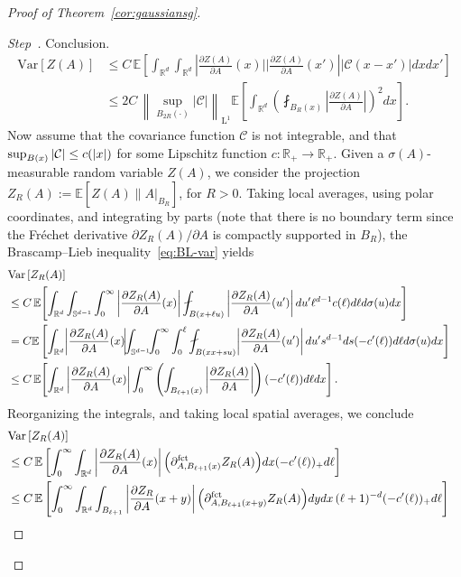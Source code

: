 \documentclass[11pt]{article}
\theoremstyle{definition}
\numberwithin{equation}{section}
\numberwithin{figure}{section}
\numberwithin{table}{section}
\newcommand{\R}{\mathbb R}
\newcommand{\Sp}{\mathbb S}
\newcommand{\E}{\mathbb{E}}
\newcommand{\Cc}{\mathcal C}
\DeclareMathOperator{\Ld}{L}
\newcommand{\parfct}[1]{\partial_{#1}^{\operatorname{fct}}}
\newcommand{\var}[1]{\mathrm{Var}\left[#1\right]}
\newcounter{stepcount}
\newenvironment{step}{\refstepcounter{stepcount}\begin{proof}[Step~\thestepcount]}{\let\qed\relax\end{proof}}
\begin{document}
\begin{proof}[Proof of Theorem~\ref{cor:gaussiansg}]
\begin{step}{Conclusion.}
\begin{align*}
\var{Z(A)}&\le C\,\E\left[\int_{\R^d}\int_{\R^d} \left|\frac{\partial Z(A)}{\partial A}(x)\bigg|\bigg|\frac{\partial Z(A)}{\partial A}(x')\right||\Cc(x-x')|dxdx'\right]
\\
&\le2C\,\left\|\sup_{B_{2R}(\cdot)}|\Cc|\right\|_{\Ld^1}\E\left[\int_{\R^d} \left(\fint_{B_R(x)}\left|\frac{\partial Z(A)}{\partial A}\right|\right)^2dx\right].
\end{align*}
Now assume that the covariance function $\Cc$ is not integrable, and that $\sup_{B(x)}\linebreak|\Cc|\le c(|x|)$ for some Lipschitz function $c:\R_+\to\R_+$. Given a $\sigma(A)$-measurable random variable $Z(A)$, we consider the projection $Z_R(A):=\E[Z(A)\| A|_{B_R}]$, for $R>0$. Taking local averages, using polar coordinates, and integrating by parts (note that there is no boundary term since the Fréchet derivative $\partial Z_R(A)/\partial A$ is compactly supported in $B_R$), the Brascamp--Lieb inequality~\eqref{eq:BL-var} yields
{\small
\begin{align*}
\lefteqn{\var{Z_R(A)}}
\\
&\le C\,\E\!\left[\int_{\R^d}\int_{\Sp^{d-1}}\int_0^\infty
\left|\frac{\partial Z_R(A)}{\partial A}(x) \right|\fint_{B(x+\ell u)}\left|\frac{\partial Z_R(A)}{\partial A}(u')\right|du' \ell^{d-1}c(\ell)d\ell d\sigma(u)dx\right]\\
&=C\E\left[\int_{\R^d}\!\left|\frac{\partial Z_R(A)}{\partial A}(x)\!\right|\!\!\int_{\Sp^{d-1}}\!\!\int_0^\infty\int_0^\ell
\fint_{B(xx+s u)}\!\left|\frac{\partial Z_R(A)}{\partial A}(u')\right|du' s^{d-1}ds(-c'(\ell))d\ell d\sigma(u)dx\right]\\
&\le C\,\E\!\left[\int_{\R^d} \left|\frac{\partial Z_R(A)}{\partial A}(x) \right|\int_0^\infty\left(\int_{B_{\ell+1}(x)}\left|\frac{\partial Z_R(A)}{\partial A}\right|\right)(-c'(\ell))d\ell dx\right].
\end{align*}
}
Reorganizing the integrals, and taking local spatial averages, we conclude
\begin{align*}
\lefteqn{\var{Z_R(A)}}
\\
&\le C\,\E\left[\int_0^\infty \int_{\R^d} \left|\frac{\partial Z_R(A)}{\partial A}(x) \right|\Big(\parfct{A,B_{\ell+1}(x)}Z_R(A)\Big) dx(-c'(\ell))_+d\ell\right]\\
&\le C\,\E\left[\int_0^\infty \int_{\R^d}\int_{B_{\ell+1}}\left|\frac{\partial Z_R}{\partial A}(x+y)\right|\Big(\parfct{A,B_{\ell+1}(x+y)}Z_R(A)\Big)dydx\,(\ell+1)^{-d}(-c'(\ell))_+d\ell\right]\\

\end{align*}
\end{step}
\end{proof}
\end{document}
